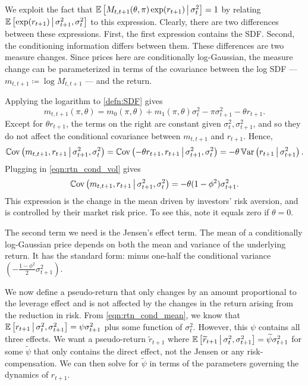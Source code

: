 \documentclass[11pt, letterpaper, twoside]{article}
\begin{document}
We exploit the fact that $\operatorname{\mathbb{E}}\left[M_{t,t+1}(\theta, \pi) \exp(r_{t+1}) \,\middle\vert\, \sigma^2_t \right] = 1$ by relating $\operatorname{\mathbb{E}}\left[\exp(r_{t+1}) \,\middle\vert\, \sigma^2_{t+1}, \sigma^2_t \right]$ to this expression. Clearly, there are two differences between these expressions. First, the first expression contains the SDF. Second, the conditioning information differs between them. These differences are two measure changes. Since prices here are conditionally log-Gaussian, the measure change can be parameterized in terms of the covariance between the log SDF --- $m_{t,t+1} \coloneqq \log M_{t,t+1}$ --- and the return.

Applying the logarithm to \cref{defn:SDF} gives
%
\begin{equation}
    \label{eqn:log_sdf}
    m_{t,t+1}(\pi, \theta) = m_{0}(\pi, \theta) + m_1(\pi, \theta) \sigma_t^2 - \pi \sigma^2_{t+1} - \theta r_{t+1}.
\end{equation}
%
Except for $\theta r_{t+1}$, the terms on the right are constant given $\sigma^2_t, \sigma^2_{t+1}$, and so they do not affect the conditional covariance between $m_{t,t+1}$ and $r_{t+1}$. Hence,
%
\begin{equation}
 \Cov\left(m_{t,t+1}, r_{t+1} \mvert \sigma^2_{t+1}, \sigma^2_t \right) 
%
 = \Cov\left(-\theta r_{t+1}, r_{t+1} \mvert \sigma^2_{t+1}, \sigma^2_t \right) 
%
 = -\theta \Var\left(r_{t+1} \mvert \sigma^2_{t+1}\right). 
\end{equation}
%
Plugging in \cref{eqn:rtn_cond_vol} gives
%
\begin{equation}
    \label{eqn:return_covarinace}
    \operatorname{\mathbb{C}ov}\left(m_{t,t+1}, r_{t+1} \,\middle\vert\, \sigma^2_{t+1}, \sigma^2_t \right) = -\theta (1 - \phi^2) \sigma^2_{t+1}.
\end{equation}
%
This expression is the change in the mean driven by investors' risk aversion, and is controlled by their market risk price. To see this, note it equals zero if $\theta = 0$.

The second term we need is the Jensen's effect term. The mean of a conditionally log-Gaussian price depends on both the mean and variance of the underlying return. It has the standard form: minus one-half the conditional variance $\left(-\frac{1 - \phi^2}{2} \sigma^2_{t+1}\right)$. 

We now define a pseudo-return that only changes by an amount proportional to the leverage effect and is not affected by the changes in the return arising from the reduction in risk. From \cref{eqn:rtn_cond_mean}, we know that $\operatorname{\mathbb{E}}\left[r_{t+1} \,\middle\vert\, \sigma^2_t, \sigma^2_{t+1} \right] = \psi \sigma^2_{t+1}$ plus some function of $\sigma^2_t$. However, this $\psi$ contains all three effects. We want a pseudo-return $\widetilde{r}_{t+1}$ where $\operatorname{\mathbb{E}}\left[\widetilde{r}_{t+1} \,\middle\vert\, \sigma^2_t, \sigma^2_{t+1} \right] = \widetilde{\psi} \sigma^2_{t+1}$ for some $\widetilde{\psi}$ that only contains the direct effect, not the Jensen or any risk-compensation. We can then solve for $\widetilde{\psi}$ in terms of the parameters governing the dynamics of $r_{t+1}$.
\end{document}
